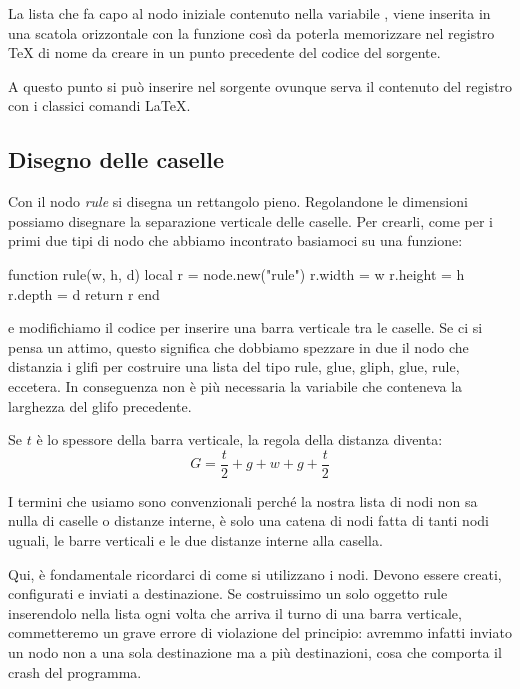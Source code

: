 La lista che fa capo al nodo iniziale contenuto nella variabile ,
viene inserita in una scatola orizzontale con la funzione
 così da poterla memorizzare nel registro
\TeX{} di nome  da creare in un punto precedente del codice del
sorgente.

A questo punto si può inserire nel sorgente ovunque serva il contenuto del
registro con i classici comandi \LaTeX.


\subsection{Disegno delle caselle}

Con il nodo \emph{rule} si disegna un rettangolo pieno. Regolandone le
dimensioni possiamo disegnare la separazione verticale delle caselle. Per
crearli, come per i primi due tipi di nodo che abbiamo incontrato basiamoci su
una funzione:
\begin{lines}
function rule(w, h, d)
    local r = node.new("rule")
    r.width = w
    r.height = h
    r.depth = d
    return r
end
\end{lines}
e modifichiamo il codice per inserire una barra verticale tra le caselle. Se ci
si pensa un attimo, questo significa che dobbiamo spezzare in due il nodo che
distanzia i glifi per costruire una lista del tipo rule, glue, gliph, glue,
rule, eccetera. In conseguenza non è più necessaria la variabile  che
conteneva la larghezza del glifo precedente.

Se \( t \) è lo spessore della barra verticale, la regola della distanza
diventa:
\[
    G = \frac{t}{2} + g + w + g + \frac{t}{2}
\]

I termini che usiamo sono convenzionali perché la nostra lista di nodi non sa
nulla di caselle o distanze interne, è solo una catena di nodi fatta di tanti
nodi uguali, le barre verticali e le due distanze interne alla casella. 

Qui, è fondamentale ricordarci di come si utilizzano i nodi. Devono essere
creati, configurati e inviati a destinazione. Se costruissimo un solo oggetto
rule inserendolo nella lista ogni volta che arriva il turno di una barra
verticale, commetteremo un grave errore di violazione del principio: avremmo
infatti inviato un nodo non a una sola destinazione ma a più destinazioni, cosa
che comporta il crash del programma.

